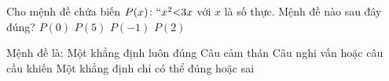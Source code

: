 \begin{ex}
	Cho mệnh đề chứa biến $P(x)\colon \lq\lq x^2{<}3x$ với $x$ là số thực. Mệnh đề nào sau đây đúng?
	\choice
		{$P(0)$}
		{$P(5)$}
		{$P(-1)$}
		{\True $P(2)$}
\end{ex}







\begin{ex}
	Mệnh đề là:
	\choice
		{Một khẳng định luôn đúng}
		{Câu cảm thán}
		{Câu nghi vấn hoặc câu cầu khiến}
		{\True Một khẳng định chỉ có thể đúng hoặc sai}
\end{ex}

